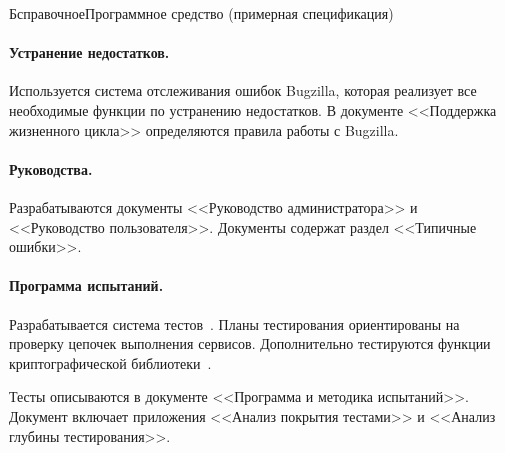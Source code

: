 \begin{appendix}{Б}{справочное}{Программное средство \CryptoDisk 
(примерная спецификация)}
\paragraph*{Устранение недостатков.}
Используется система отслеживания ошибок Bugzilla,
которая реализует все необходимые функции по устранению недостатков.
В документе <<Поддержка жизненного цикла>> определяются 
правила работы с Bugzilla.

\paragraph*{Руководства.}
Разрабатываются документы <<Руководство администратора>> 
и <<Руководство пользователя>>. Документы содержат раздел
<<Типичные ошибки>>.

\paragraph*{Программа испытаний.}
Разрабатывается система тестов~\CryptoDisk.
Планы тестирования ориентированы на проверку цепочек выполнения сервисов.
Дополнительно тестируются функции криптографической библиотеки~\CryptoKernel. 

Тесты описываются в документе <<Программа и методика испытаний>>.
Документ включает приложения 
<<Анализ покрытия тестами>> и <<Анализ глубины тестирования>>.

\end{appendix}
